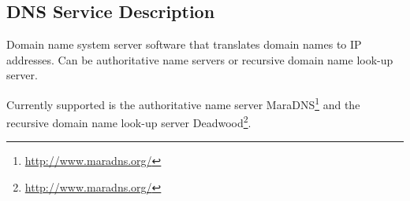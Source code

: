 \subsection{DNS Service Description}

Domain name system server software that translates domain names to IP addresses.
Can be authoritative name servers or recursive domain name look-up server.

Currently supported is the authoritative name server 
MaraDNS\footnote{\url{http://www.maradns.org/}} and the
recursive domain name look-up server 
Deadwood\footnote{\url{http://www.maradns.org/}}.
